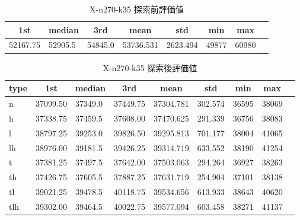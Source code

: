 \begin{table}[htbp]
    \caption{X-n270-k35 探索前評価値}
    \begin{tabular}{|l|l|l|l|l|l|l|l|}\hline
    \multicolumn{1}{|c|}{\textbf{1st}}
    &\multicolumn{1}{c|}{\textbf{median}}
    &\multicolumn{1}{c|}{\textbf{3rd}}
    &\multicolumn{1}{c|}{\textbf{mean}}
    &\multicolumn{1}{c|}{\textbf{std}}
    &\multicolumn{1}{c|}{\textbf{min}}
    &\multicolumn{1}{c|}{\textbf{max}}\\\hline
	52167.75 & 52905.5 & 54845.0 & 53736.531 & 2623.494 & 49877 & 60980\\\hline
	\end{tabular}
\end{table}
\begin{table}[htbp]
    \caption{X-n270-k35 探索後評価値}
    \begin{tabular}{|l|l|l|l|l|l|l|l|l|}\hline
    \multicolumn{1}{|c|}{\textbf{type}}
    &\multicolumn{1}{|c|}{\textbf{1st}}
    &\multicolumn{1}{c|}{\textbf{median}}
    &\multicolumn{1}{c|}{\textbf{3rd}}
    &\multicolumn{1}{c|}{\textbf{mean}}
    &\multicolumn{1}{c|}{\textbf{std}}
    &\multicolumn{1}{c|}{\textbf{min}}
    &\multicolumn{1}{c|}{\textbf{max}}\\\hline
	n & 37099.50 & 37349.0 & 37449.75 & 37304.781 & 302.574 & 36595 & 38069\\\hline
	h & 37338.75 & 37459.5 & 37608.00 & 37470.625 & 291.339 & 36756 & 38083\\\hline
	l & 38797.25 & 39253.0 & 39826.50 & 39295.813 & 701.177 & 38004 & 41065\\\hline
	lh & 38976.00 & 39181.5 & 39426.25 & 39314.719 & 633.552 & 38190 & 41254\\\hline
	t & 37381.25 & 37497.5 & 37642.00 & 37503.063 & 294.264 & 36927 & 38263\\\hline
	th & 37426.75 & 37605.5 & 37887.25 & 37631.719 & 254.904 & 37101 & 38138\\\hline
	tl & 39021.25 & 39478.5 & 40118.75 & 39534.656 & 613.933 & 38643 & 40620\\\hline
	tlh & 39302.00 & 39464.5 & 40022.75 & 39577.094 & 603.458 & 38271 & 41137\\\hline
	\end{tabular}
\end{table}
